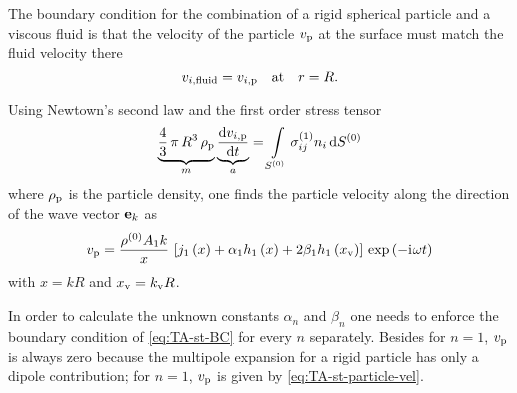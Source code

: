 The boundary condition for the combination of a rigid spherical particle and a 
viscous fluid is that the velocity of the particle $v_{\mathrm{p}}$ at the 
surface must match the fluid velocity there
\begin{equation}
  v_{i,\mathrm{fluid}} = v_{i,\mathrm{p}}\quad\text{at}\quad r = R.
  \label{eq:TA-st-BC}
\end{equation}

Using Newtown's second law and the first order stress tensor
\begin{equation}
  \underbrace{\frac{4}{3}\,\pi\,R^{3}\,\rho_{\mathrm{p}}}_{m}
  \underbrace{\dv{v_{i,\mathrm{p}}}{t}}_{a} = 
  \int\limits_{S^{(0)}}\sigma_{ij}^{(1)}n_{i}\dd{  S^{(0)}  }
  \label{eq:TA-st-newton}
\end{equation}
where $\rho_{\mathrm{p}}$ is the particle density, one finds the particle 
velocity along the direction of the wave vector $\vb{e}_{k}$ as
\begin{equation}
  v_{\mathrm{p}} = \frac{\rho^{(0)}A_{1}k}{x}\,
  \left[
    j_{1}\left(x\right) + \alpha_{1}h_{1}\left(x\right) + 2\beta_{1}h_{1}\left(x_{\mathrm{v}}\right)
  \right]
  \,\exp\left( -\mathrm{i}\mkern1mu\omega t \right)
  \label{eq:TA-st-particle-vel}
\end{equation}
with $x=kR$ and $x_{\mathrm{v}}=k_{\mathrm{v}}R$.

In order to calculate the unknown constants $\alpha_{n}$ and $\beta_{n}$ one 
needs to enforce the boundary condition of \cref{eq:TA-st-BC} for every $n$ 
separately. Besides for $n=1$, $v_{\mathrm{p}}$ is always zero because the 
multipole expansion for a rigid particle has only a dipole contribution; for 
$n=1$, $v_{\mathrm{p}}$ is given by \cref{eq:TA-st-particle-vel}.

